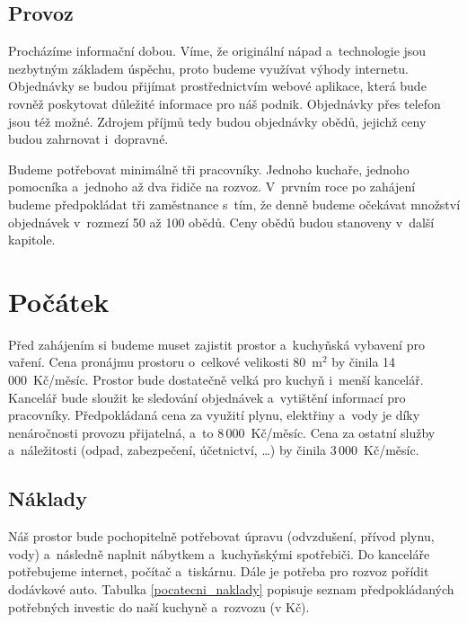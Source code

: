 \subsection{Provoz}
Procházíme informační dobou. Víme, že originální nápad a~technologie jsou nezbytným základem úspěchu, proto budeme využívat výhody internetu. Objednávky se budou při\-jímat prostřednictvím webové aplikace, která bude rovněž poskytovat důležité informace pro náš podnik. Objednávky přes telefon jsou též možné. Zdrojem příjmů tedy budou objednávky obědů, jejichž ceny budou zahrnovat i~dopravné.

Budeme potřebovat minimálně tři pracovníky. Jednoho kuchaře, jednoho pomocníka a~jednoho až dva řidiče na rozvoz. V~prvním roce po zahájení budeme předpokládat tři zaměstnance s~tím, že denně budeme očekávat množství objednávek v~rozmezí 50 až 100 obědů. Ceny obědů budou stanoveny v~další kapitole.





\section{Počátek} \label{sec_pocatek}
Před zahájením si budeme muset zajistit prostor a~kuchyňská vybavení pro vaření. Cena pronájmu prostoru o~celkové velikosti 80~m$^2$ by činila 14\,000~Kč/měsíc. Prostor bude dostatečně velká pro kuchyň i~menší kancelář. Kancelář bude sloužit ke sledování objednávek a~vytištění informací pro pracovníky. Předpokládaná cena za využití plynu, elektřiny a~vody je díky nenáročnosti provozu přijatelná, a~to 8\,000~Kč/měsíc. Cena za ostatní služby a~náležitosti (odpad, zabezpečení, účetnictví, \ldots) by činila 3\,000~Kč/měsíc.

\subsection{Náklady}
Náš prostor bude pochopitelně potřebovat úpravu (odvzdušení, přívod plynu, vody) a~ná\-sledně naplnit nábytkem a~kuchyňskými spotřebiči. Do kanceláře potřebujeme internet, počítač a~tiskárnu. Dále je potřeba pro rozvoz pořídit dodávkové auto. Tabulka \ref{pocatecni_naklady} popisuje seznam předpokládaných potřebných investic do naší kuchyně a~rozvozu (v Kč).

